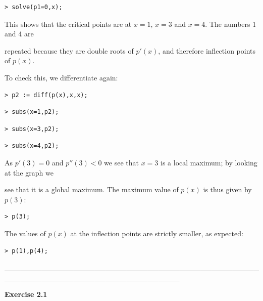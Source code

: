\documentclass{article}
\begin{document}
\begin{lstlisting}
> solve(p1=0,x);
\end{lstlisting}
\begin{Maple Normal}
This shows that the critical points are at 
$x =1$, 
$x =3$ and 
$x =4$.  The numbers 1 and 4 are
\end{Maple Normal}
\begin{Maple Normal}
repeated because they are double roots of 
$\mathit{p'} (x)$, and therefore inflection points of 
$p (x)$.
\end{Maple Normal}
\begin{Maple Normal}
To check this, we differentiate again:
\end{Maple Normal}
\begin{lstlisting}
> p2 := diff(p(x),x,x);
\end{lstlisting}
\begin{lstlisting}
> subs(x=1,p2);
\end{lstlisting}
\begin{lstlisting}
> subs(x=3,p2);
\end{lstlisting}
\begin{lstlisting}
> subs(x=4,p2);
\end{lstlisting}
\begin{Maple Normal}
As 
$\mathit{p'} (3)=0$ and 
$\mathit{p''} (3)<0$ we see that 
$x =3$ is a local maximum; by looking at the graph we
\end{Maple Normal}
\begin{Maple Normal}
see that it is a global maximum.  The maximum value of 
$p (x)$ is thus given by 
$p (3)$:
\end{Maple Normal}
\begin{lstlisting}
> p(3);
\end{lstlisting}
\begin{Maple Normal}
The values of 
$p (x)$ at the inflection points are strictly smaller, as expected:
\end{Maple Normal}
\begin{lstlisting}
> p(1),p(4);
\end{lstlisting}
\begin{Maple Normal}
\_\_\_\_\_\_\_\_\_\_\_\_\_\_\_\_\_\_\_\_\_\_\_\_\_\_\_\_\_\_\_\_\_\_\_\_\_\_\_\_\_\_\_\_\_\_\_\_\_\_\_\_\_\_\_\_\_\_\_\_\_\_\_\_\_\_\_\_\_\_\_\_\_\_\_\_\_\_\_\_\_
\end{Maple Normal}
\begin{Maple Heading 2}
\textbf{Exercise 2.1}
\end{Maple Heading 2}
\end{document}
